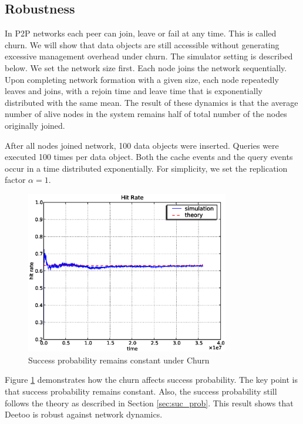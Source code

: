 \documentclass[9.5pt,journal,final,finalsubmission,twocolumn]{IEEEtran}
\begin{document}
\subsection{Robustness}
In P2P networks each peer can join, leave or fail 
at any time.  This is called churn.
We will show that data objects are still accessible without generating 
excessive management overhead under churn.
The simulator setting is described below.
We set the network size first. Each node joins the network sequentially.
Upon completing network formation with a given size, each node repeatedly 
leaves and joins, with a rejoin time and leave time that is exponentially
distributed with the same mean. 
The result of these dynamics is that the average number of 
alive nodes in the system remains half of total number of the nodes 
originally joined. 

After all nodes joined network, 100 data objects were inserted.
Queries were executed 100 times per data object. 
Both the cache events and the query events occur 
in a time distributed exponentially.
For simplicity, we set the replication factor $\alpha=1$.

\begin{figure}
\centering
\includegraphics[width=3.5in]{hit_ch}
\caption{Success probability remains constant under Churn} \label{fig:hit_churn}
\end{figure}
Figure \ref{fig:hit_churn} demonstrates how the churn affects success probability.
The key point is that success probability remains constant. 
Also, the success probability still follows the theory as described in Section \ref{sec:suc_prob}.
This result shows that Deetoo is robust against network dynamics. 
\end{document}
